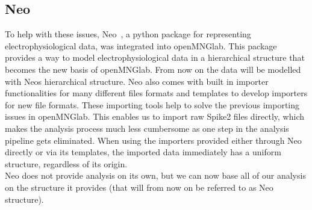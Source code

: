 \subsection{Neo}
To help with these issues, Neo~\cite{neo14}, a python package for representing electrophysiological data, was integrated into openMNGlab. This package provides a way to model electrophysiological data in a hierarchical structure that becomes the new basis of openMNGlab. From now on the data will be modelled with Neos hierarchical structure. 
Neo also comes with built in importer functionalities for many different files formats and templates to develop importers for new file formats.  These importing tools help to solve the previous importing issues in openMNGlab. This enables us to import raw Spike2 files directly, which makes the analysis process much less cumbersome as one step in the analysis pipeline gets eliminated. 
When using the importers provided either through Neo directly or via its templates, the imported data immediately has a uniform structure, regardless of its origin. \\
Neo does not provide analysis on its own, but we can now base all of our analysis on the structure it provides (that will from now on be referred to as Neo structure). \\








